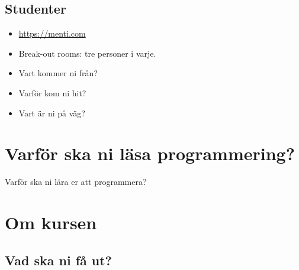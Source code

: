 \subsection{Studenter}

\begin{frame}
  \begin{exercise}
    \begin{itemize}
      \item \url{https://menti.com}
    \end{itemize}
  \end{exercise}
\end{frame}

\begin{frame}
  \begin{exercise}[Vilka är ni?]
    \begin{itemize}
      \item Break-out rooms: tre personer i varje.
      \item Vart kommer ni från?
      \item Varför kom ni hit?
      \item Vart är ni på väg?
    \end{itemize}
  \end{exercise}
\end{frame}


\section{Varför ska ni läsa programmering?}

\begin{frame}
  \begin{center}
    Varför ska ni lära er att programmera?
  \end{center}
\end{frame}


\section{Om kursen}

\subsection{Vad ska ni få ut?}

